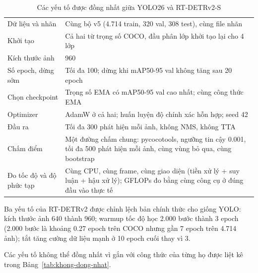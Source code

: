 \begin{table}[H]
  \centering
  \caption{Các yếu tố được đồng nhất giữa YOLO26 và RT-DETRv2-S}
  \label{tab:dong-nhat}
  \small
  \begin{tabularx}{\linewidth}{P{4cm}L}
    \toprule
     &  \\ \midrule
    Dữ liệu và nhãn & Cùng bộ v5 (4.714 train, 320 val, 308 test), cùng file nhãn \\ \rowsep
    Khởi tạo & Cả hai từ trọng số COCO, đầu phân lớp khởi tạo lại cho 4 lớp \\ \rowsep
    Kích thước ảnh & 960 \\ \rowsep
    Số epoch, dừng sớm & Tối đa 100; dừng khi mAP50-95 val không tăng sau 20 epoch \\ \rowsep
    Chọn checkpoint & Trọng số EMA có mAP50-95 val cao nhất; cùng công thức EMA \\ \rowsep
    Optimizer & AdamW ở cả hai; huấn luyện độ chính xác hỗn hợp; seed 42 \\ \rowsep
    Đầu ra & Tối đa 300 phát hiện mỗi ảnh, không NMS, không TTA \\ \rowsep
    Chấm điểm & Một đường chấm chung: pycocotools, ngưỡng tin cậy 0.001, tối đa 500 phát hiện mỗi ảnh, cùng vùng bỏ
      qua, cùng bootstrap \\ \rowsep
    Đo tốc độ và độ phức tạp & Cùng CPU, cùng frame, cùng giao diện (tiền xử lý + suy luận + hậu xử lý); GFLOPs đo bằng
      cùng công cụ ở đúng đầu vào thực tế \\ \bottomrule
  \end{tabularx}
\end{table}

Ba yếu tố của RT-DETRv2 được chỉnh lệch bản chính thức cho giống YOLO: kích thước ảnh 640 thành 960; warmup tốc độ học
2.000 bước thành 3 epoch (2.000 bước là khoảng 0.27 epoch trên COCO nhưng gần 7 epoch trên 4.714 ảnh); tắt tăng cường
dữ liệu mạnh ở 10 epoch cuối thay vì 3.

Các yếu tố không thể đồng nhất vì gắn với công thức của từng họ được liệt kê trong Bảng~\ref{tab:khong-dong-nhat}.


